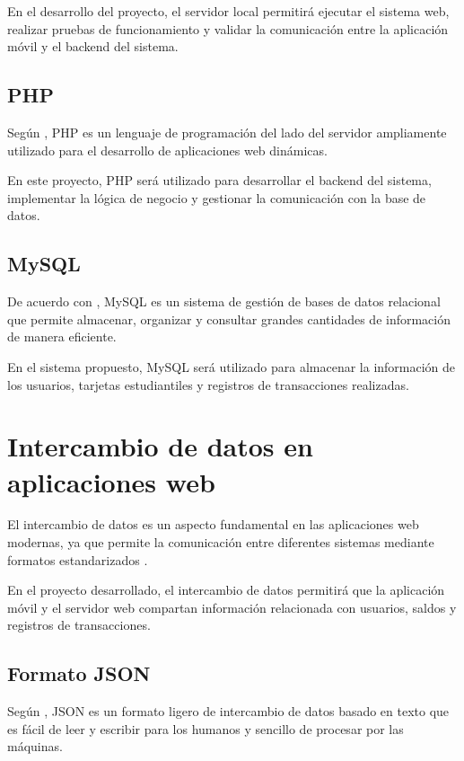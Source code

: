 \documentclass[12pt,letterpaper]{report}
\begin{document}
	En el desarrollo del proyecto, el servidor local permitirá ejecutar el sistema web, realizar pruebas de funcionamiento y validar la comunicación entre la aplicación móvil y el backend del sistema.
	
	\subsection{PHP}
	
	Según \citet{phpmanual2023}, PHP es un lenguaje de programación del lado del servidor ampliamente utilizado para el desarrollo de aplicaciones web dinámicas.
	
	En este proyecto, PHP será utilizado para desarrollar el backend del sistema, implementar la lógica de negocio y gestionar la comunicación con la base de datos.
	
	\subsection{MySQL}
	
	De acuerdo con \citet{mysql2023}, MySQL es un sistema de gestión de bases de datos relacional que permite almacenar, organizar y consultar grandes cantidades de información de manera eficiente.
	
	En el sistema propuesto, MySQL será utilizado para almacenar la información de los usuarios, tarjetas estudiantiles y registros de transacciones realizadas.
	
	\section{Intercambio de datos en aplicaciones web}
	
	El intercambio de datos es un aspecto fundamental en las aplicaciones web modernas, ya que permite la comunicación entre diferentes sistemas mediante formatos estandarizados \citep{kurose2017}.
	
	En el proyecto desarrollado, el intercambio de datos permitirá que la aplicación móvil y el servidor web compartan información relacionada con usuarios, saldos y registros de transacciones.
	
	\subsection{Formato JSON}
	
	Según \citet{ecma404}, JSON es un formato ligero de intercambio de datos basado en texto que es fácil de leer y escribir para los humanos y sencillo de procesar por las máquinas.
	
\end{document}
